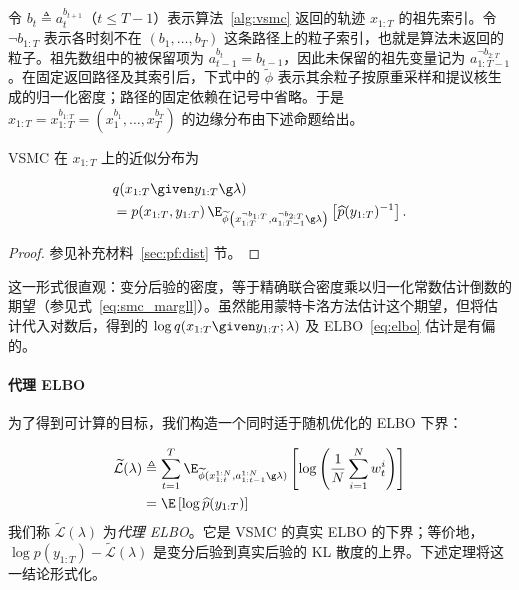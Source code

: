 令 $b_t\triangleq a_t^{b_{t+1}}$（$t\leq T-1$）表示算法~\ref{alg:vsmc} 返回的轨迹 $x_{1:T}$ 的祖先索引。令 $\neg b_{1:T}$ 表示各时刻不在 $(b_1,\ldots,b_T)$ 这条路径上的粒子索引，也就是算法未返回的粒子。祖先数组中的被保留项为 $a_{t-1}^{b_t}=b_{t-1}$，因此未保留的祖先变量记为 $a_{1:T-1}^{\neg b_{2:T}}$。在固定返回路径及其索引后，下式中的 $\widetilde\phi$ 表示其余粒子按原重采样和提议核生成的归一化密度；路径的固定依赖在记号中省略。于是 $x_{1:T}=x_{1:T}^{b_{1:T}}=(x_1^{b_1},\ldots,x_T^{b_T})$ 的边缘分布由下述命题给出。

\begin{prop}\label{prop:dist}
VSMC 在 $x_{1:T}$ 上的近似分布为

\begin{align}
&q(x_{1:T} \given y_{1:T} \g\lambda) \nonumber \\
&= p(x_{1:T},y_{1:T})  \, 
\E_{\widetilde\phi\left(x_{1:T}^{\neg b_{1:T}},a_{1:T-1}^{\neg b_{2:T}} \g \lambda \right)}
\left[\widehat p(y_{1:T})^{-1}\right].\label{eq:var-dist}
\end{align}

\end{prop}
\begin{proof}

参见补充材料~\ref{sec:pf:dist} 节。
\end{proof}
这一形式很直观：变分后验的密度，等于精确联合密度乘以归一化常数估计倒数的期望（参见式~\eqref{eq:smc_margll}）。虽然能用蒙特卡洛方法估计这个期望，但将估计代入对数后，得到的 $\log q(x_{1:T}\given y_{1:T};\lambda)$ 及 ELBO~\eqref{eq:elbo} 估计是有偏的。

\paragraph{代理 ELBO}为了得到可计算的目标，我们构造一个同时适于随机优化的 ELBO 下界：

\begin{align}
\widetilde{\mathcal{L}}(\lambda) &\triangleq \sum_{t=1}^T\E_{\widetilde\phi(x_{1:t}^{1:N},a_{1:t-1}^{1:N}\g\lambda)}\left[ 
\log \left( \frac{1}{N}\sum_{i=1}^N w_t^i\right) \right] \nonumber \\
& = \E
\left[\log \widehat{p}(y_{1:T})\right]
\label{eq:lb}
\end{align}
我们称 $\widetilde{\mathcal L}(\lambda)$ 为\emph{代理 ELBO}。它是 VSMC 的真实 ELBO 的下界；等价地，$\log p(y_{1:T})-\widetilde{\mathcal L}(\lambda)$ 是变分后验到真实后验的 KL 散度的上界。下述定理将这一结论形式化。


